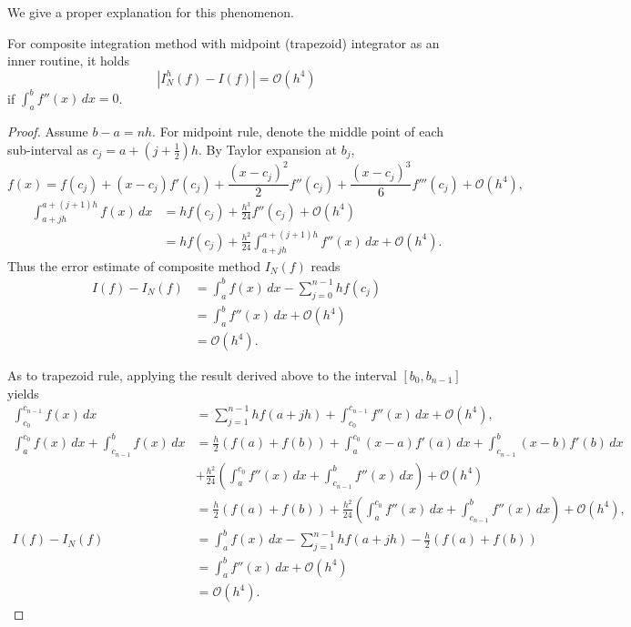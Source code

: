 \documentclass{article}
\begin{document}
We give a proper explanation for this phenomenon.
\begin{proposition}
	For composite integration method with midpoint (trapezoid) integrator as an inner routine, it holds
	\begin{equation}
	|I_N^h(f)-I(f)|=\mathcal O (h^4)
	\end{equation}
	if $\int_a^b f''(x)\,dx=0$.
\end{proposition}
\begin{proof}
	Assume $b-a=nh$. For midpoint rule, denote the middle point of each sub-interval as $c_j=a+(j+\frac{1}{2})h$. By Taylor expansion at $b_j$,
	\begin{equation}
	f(x)=f(c_j)+(x-c_j)f'(c_j)+\frac{(x-c_j)^2}{2}f''(c_j)+\frac{(x-c_j)^3}{6}f'''(c_j) +\mathcal O (h^4),
	\end{equation}
	\begin{equation}
	\begin{aligned}
	\int_{a+jh}^{a+(j+1)h} f(x)\,dx& = hf(c_j)+\frac{h^3}{24}f''(c_j)+\mathcal O(h^4)\\
	&= hf(c_j)+\frac{h^2}{24}\int_{a+jh}^{a+(j+1)h}f''(x)\,dx+\mathcal O(h^4).
	\end{aligned}
	\end{equation}
	Thus the error estimate of composite method $I_N(f)$ reads
	\begin{equation}
	\begin{aligned}
	I(f)-I_N(f) &= \int_a^b f(x)\,dx-\sum_{j=0}^{n-1} hf(c_j)\\
	&= \int_a^b f''(x)\,dx +\mathcal O(h^4)\\
	&= \mathcal O(h^4).
	\end{aligned}
	\end{equation}
	
	As to trapezoid rule, applying the result derived above to the interval $[b_0,b_{n-1}]$ yields
	\begin{equation}
	\begin{aligned}
	\int_{c_0}^{c_{n-1}}f(x)\,dx &= \sum_{j=1}^{n-1} hf(a+jh)+\int_{c_0}^{c_{n-1}}f''(x)\,dx+\mathcal O(h^4),\\ 
	\int_{a}^{c_0}f(x)\,dx+\int_{c_{n-1}}^bf(x)\,dx &= \frac{h}{2}(f(a)+f(b))+\int_a^{c_0}(x-a)f'(a)\,dx+\int_{c_{n-1}}^b (x-b)f'(b)\,dx \\ &+\frac{h^2}{24}(\int_{a}^{c_0}f''(x)\,dx+\int_{c_{n-1}}^bf''(x)\,dx)+\mathcal O(h^4)\\
	&=\frac{h}{2}(f(a)+f(b))+\frac{h^2}{24}(\int_{a}^{c_0}f''(x)\,dx+\int_{c_{n-1}}^bf''(x)\,dx)+\mathcal O(h^4),\\
	I(f)-I_N(f) &= \int_a^b f(x)\,dx-\sum_{j=1}^{n-1} hf(a+jh)-\frac{h}{2}(f(a)+f(b))\\
	&= \int_a^b f''(x)\,dx +\mathcal O(h^4)\\
	&= \mathcal O(h^4).
	\end{aligned}
	\end{equation}
\end{proof}
\end{document}
